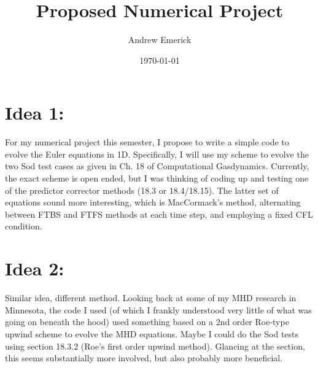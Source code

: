\documentclass{article}
\begin{document}
\title{Proposed Numerical Project}
\author{Andrew Emerick}

\date\today
\maketitle

\section{Idea 1:}
For my numerical project this semester, I propose to write a simple code to 
evolve the Euler equations in 1D. Specifically, I will use my scheme to evolve
the two Sod test cases as given in Ch. 18 of Computational Gasdynamics.
Currently, the exact scheme is open ended, but I was thinking of coding up
and testing one of the predictor corrector methods (18.3 or 18.4/18.15). 
The latter set of equations sound more interesting, which is MacCormack's
method, alternating between FTBS and FTFS methods at each time step, and 
employing a fixed CFL condition.

\section{Idea 2:}
Similar idea, different method. Looking back at some of my MHD research in
Minnesota, the code I used (of which I frankly understood very little of what
was going on beneath the hood) used something based on a 2nd order 
Roe-type upwind scheme to evolve the MHD equations.
Maybe I could do the Sod tests using section 18.3.2 (Roe's first order 
upwind method). Glancing at the section, this seems substantially more involved,
but also probably more beneficial.
\end{document}
